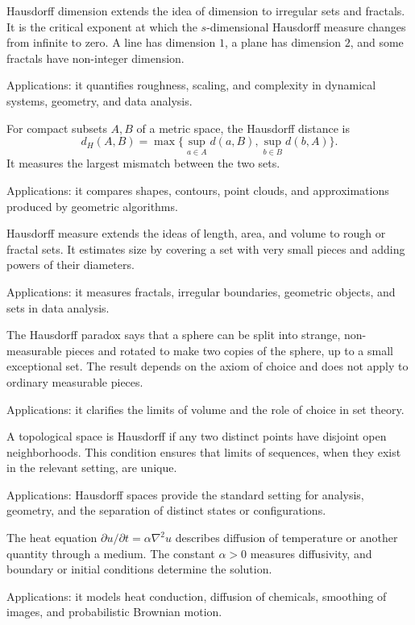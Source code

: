 Hausdorff dimension extends the idea of dimension to irregular sets and fractals. It is the critical exponent at which the $s$-dimensional Hausdorff measure changes from infinite to zero. A line has dimension $1$, a plane has dimension $2$, and some fractals have non-integer dimension. \par\noindent Applications: it quantifies roughness, scaling, and complexity in dynamical systems, geometry, and data analysis.

For compact subsets $A,B$ of a metric space, the Hausdorff distance is
\[
d_H(A,B)=\max\{\sup_{a\in A}d(a,B),\sup_{b\in B}d(b,A)\}.
\]
It measures the largest mismatch between the two sets. \par\noindent Applications: it compares shapes, contours, point clouds, and approximations produced by geometric algorithms.

Hausdorff measure extends the ideas of length, area, and volume to rough or fractal sets. It estimates size by covering a set with very small pieces and adding powers of their diameters. \par\noindent Applications: it measures fractals, irregular boundaries, geometric objects, and sets in data analysis.

The Hausdorff paradox says that a sphere can be split into strange, non-measurable pieces and rotated to make two copies of the sphere, up to a small exceptional set. The result depends on the axiom of choice and does not apply to ordinary measurable pieces. \par\noindent Applications: it clarifies the limits of volume and the role of choice in set theory.

A topological space is Hausdorff if any two distinct points have disjoint open neighborhoods. This condition ensures that limits of sequences, when they exist in the relevant setting, are unique. \par\noindent Applications: Hausdorff spaces provide the standard setting for analysis, geometry, and the separation of distinct states or configurations.

The heat equation $\partial u/\partial t=\alpha\nabla^2u$ describes diffusion of temperature or another quantity through a medium. The constant $\alpha>0$ measures diffusivity, and boundary or initial conditions determine the solution. \par\noindent Applications: it models heat conduction, diffusion of chemicals, smoothing of images, and probabilistic Brownian motion.

